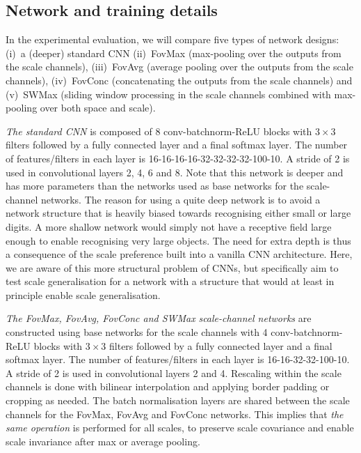 \documentclass[twocolumn,runningheads]{svjour3}
\begin{document}
\subsection{Network and training details}

In the experimental evaluation, we will compare five types of network
designs:
(i)~a (deeper) standard CNN 
(ii)~FovMax (max-pooling over the outputs from the scale channels),
(iii)~FovAvg (average pooling over the outputs from the scale channels),
(iv)~FovConc (concatenating the outputs from the scale channels) and
(v)~SWMax (sliding window processing in the scale channels combined with max-pooling over both space and scale).

{\em The standard CNN\/} is composed of 8 conv-batchnorm-ReLU blocks with $3 \times 3$ filters
followed by a fully connected layer and a final softmax layer. The
number of features/filters in each layer is
16-16-16-16-32-32-32-32-100-10. A stride of 2 is used in convolutional
layers 2, 4, 6 and 8. Note that this network is deeper and has more parameters than the networks used as base networks for the scale-channel networks. The reason for using a quite deep network is to
avoid a network structure that is heavily biased towards recognising
either small or large digits. A more shallow network would simply not have a receptive field large enough to enable recognising very large objects. The need for extra depth is thus a consequence of the scale preference built into a vanilla CNN architecture. Here, we are aware of this more structural problem of CNNs, but specifically aim to test scale generalisation for a network with a structure that would at least in principle enable scale generalisation.

{\em The FovMax, FovAvg, FovConc and SWMax \/}{\em scale-channel networks} are constructed using base networks for the scale channels with
4 conv-batchnorm-ReLU blocks with $3 \times 3$ filters followed by a fully connected layer and a
final softmax layer. The number of features/filters in each layer is 16-16-32-32-100-10. A
stride of 2 is used in convolutional layers 2 and 4. Rescaling within the scale channels is done with
bilinear interpolation and applying border padding or cropping as
needed. The batch normalisation layers are shared between the scale channels for the FovMax, FovAvg and FovConc networks. This implies that \emph{the same operation} is performed for all scales, to preserve scale covariance and enable scale invariance after max or average pooling.
\end{document}
